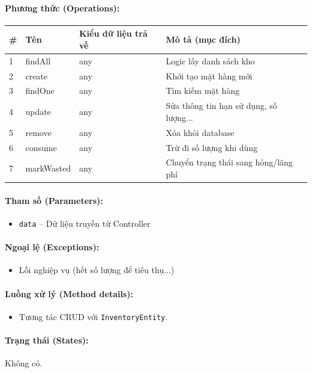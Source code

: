 \documentclass[12pt,a4paper]{article}
\begin{document}
\paragraph{Phương thức (Operations):}
\begin{longtable}{|p{0.6cm}|p{5.0cm}|p{2.8cm}|p{5.4cm}|}
\hline
\textbf{\#} & \textbf{Tên} & \textbf{Kiểu dữ liệu trả về} & \textbf{Mô tả (mục đích)} \\ \hline
\endhead
1 & findAll & any & Logic lấy danh sách kho \\ \hline
2 & create & any & Khởi tạo mặt hàng mới \\ \hline
3 & findOne & any & Tìm kiếm mặt hàng \\ \hline
4 & update & any & Sửa thông tin hạn sử dụng, số lượng... \\ \hline
5 & remove & any & Xóa khỏi database \\ \hline
6 & consume & any & Trừ đi số lượng khi dùng \\ \hline
7 & markWasted & any & Chuyển trạng thái sang hỏng/lãng phí \\ \hline
\end{longtable}

\paragraph{Tham số (Parameters):}
\begin{itemize}[leftmargin=*]
    \item \texttt{data} – Dữ liệu truyền từ Controller
\end{itemize}


\paragraph{Ngoại lệ (Exceptions):}
\begin{itemize}[leftmargin=*]
    \item Lỗi nghiệp vụ (hết số lượng để tiêu thụ...)
\end{itemize}


\paragraph{Luồng xử lý (Method details):}
\begin{itemize}[leftmargin=*]
    \item Tương tác CRUD với \texttt{InventoryEntity}.
\end{itemize}


\paragraph{Trạng thái (States):}
Không có.
\end{document}

